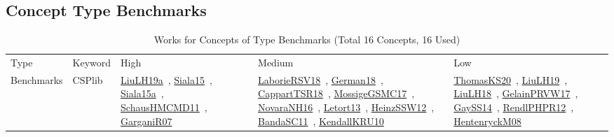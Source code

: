 \clearpage
\subsection{Concept Type Benchmarks}
\label{sec:Benchmarks}
\label{Benchmarks}
{\scriptsize
\begin{longtable}{lp{3cm}>{\raggedright\arraybackslash}p{6cm}>{\raggedright\arraybackslash}p{6cm}>{\raggedright\arraybackslash}p{8cm}}
\rowcolor{white}\caption{Works for Concepts of Type Benchmarks (Total 16 Concepts, 16 Used)}\\ \toprule
\rowcolor{white}Type & Keyword & High & Medium & Low\\ \midrule\endhead
\bottomrule
\endfoot
\index{CSPlib}\index{Benchmarks!CSPlib}Benchmarks & CSPlib & \href{../works/LiuLH19a.pdf}{LiuLH19a}~\cite{LiuLH19a}, \href{../works/Siala15.pdf}{Siala15}~\cite{Siala15}, \href{../works/Siala15a.pdf}{Siala15a}~\cite{Siala15a}, \href{../works/SchausHMCMD11.pdf}{SchausHMCMD11}~\cite{SchausHMCMD11}, \href{../works/GarganiR07.pdf}{GarganiR07}~\cite{GarganiR07} & \href{../works/LaborieRSV18.pdf}{LaborieRSV18}~\cite{LaborieRSV18}, \href{../works/German18.pdf}{German18}~\cite{German18}, \href{../works/CappartTSR18.pdf}{CappartTSR18}~\cite{CappartTSR18}, \href{../works/MossigeGSMC17.pdf}{MossigeGSMC17}~\cite{MossigeGSMC17}, \href{../works/NovaraNH16.pdf}{NovaraNH16}~\cite{NovaraNH16}, \href{../works/Letort13.pdf}{Letort13}~\cite{Letort13}, \href{../works/HeinzSSW12.pdf}{HeinzSSW12}~\cite{HeinzSSW12}, \href{../works/BandaSC11.pdf}{BandaSC11}~\cite{BandaSC11}, \href{../works/KendallKRU10.pdf}{KendallKRU10}~\cite{KendallKRU10} & \href{../works/ThomasKS20.pdf}{ThomasKS20}~\cite{ThomasKS20}, \href{../works/LiuLH19.pdf}{LiuLH19}~\cite{LiuLH19}, \href{../works/LiuLH18.pdf}{LiuLH18}~\cite{LiuLH18}, \href{../works/GelainPRVW17.pdf}{GelainPRVW17}~\cite{GelainPRVW17}, \href{../works/GaySS14.pdf}{GaySS14}~\cite{GaySS14}, \href{../works/RendlPHPR12.pdf}{RendlPHPR12}~\cite{RendlPHPR12}, \href{../works/HentenryckM08.pdf}{HentenryckM08}~\cite{HentenryckM08}\\

\end{longtable}}

